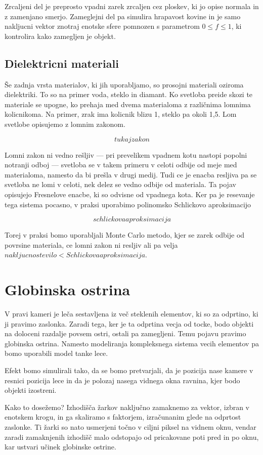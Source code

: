 \documentclass[12pt, a4paper]{article}
\begin{document}
Zrcaljeni del je preprosto vpadni zarek zrcaljen cez ploskev, ki jo opise normala in z zamenjano smerjo.
Zameglejni del pa simulira hrapavost kovine in je samo nakljucni vektor znotraj enotske sfere pomnozen
s parametrom $0 \leq f \leq 1$, ki kontrolira kako zamegljen je objekt.

\subsection{Dielektricni materiali}
Še zadnja vrsta materialov, ki jih uporabljamo, so prosojni materiali oziroma dielektriki. To so na primer voda,
steklo in diamant. Ko svetloba preide skozi te materiale se upogne, ko prehaja med dvema materialoma z
različnima lomnima kolicnikoma. Na primer, zrak ima kolicnik blizu 1, steklo pa okoli 1,5. Lom svetlobe opisujemo
z lomnim zakonom.

$$
	tukaj zakon
$$


Lomni zakon ni vedno rešljiv — pri prevelikem vpadnem kotu nastopi popolni notranji odboj — svetloba se v takem
primeru v celoti odbije od meje med materialoma, namesto da bi prešla v drugi medij. Tudi ce je enacba resljiva
pa se svetloba ne lomi v celoti, nek delez se vedno odbije od materiala. Ta pojav opisujejo Fresnelove enacbe, ki
so odvisne od vpadnega kota. Ker pa je resevanje tega sistema pocasno, v praksi uporabimo polinomsko Schlickovo
aproksimacijo

$$
	schlickova aproksimacija
$$

Torej v praksi bomo uporabljali Monte Carlo metodo, kjer se zarek odbije od povrsine materiala, ce lomni zakon
ni resljiv ali pa velja $nakljucno stevilo < Schlickova aproksimacija$.

\section{Globinska ostrina}

V pravi kameri je leča sestavljena iz več steklenih elementov, ki so za odprtino, ki ji pravimo zaslonka.
Zaradi tega, ker je ta odprtina vecja od tocke, bodo objekti na doloceni razdalje povsem ostri, ostali pa
zamegljeni. Temu pojavu pravimo globinska ostrina. Namesto modeliranja kompleksnega sistema vecih elementov
pa bomo uporabili model tanke lece.


Efekt bomo simulirali tako, da se bomo pretvarjali, da je pozicija nase kamere v resnici pozicija lece in
da je polozaj nasega vidnega okna ravnina, kjer bodo objekti izostreni.

Kako to dosežemo? Izhodišča žarkov naključno zamaknemo za vektor, izbran v enotskem krogu, in ga skaliramo s
faktorjem, izračunanim glede na odprtost zaslonke. Ti žarki so nato usmerjeni točno v ciljni piksel na vidnem
oknu, vendar zaradi zamaknjenih izhodišč malo odstopajo od pricakovane poti pred in po oknu, kar ustvari učinek
globinske ostrine.

\printbibliography
\end{document}
